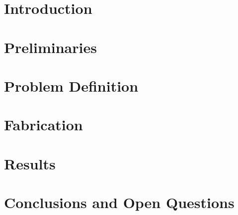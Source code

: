 \documentclass[a4paper]{article}
\begin{document}
\newpage
{}%
\section{Introduction}


\newpage
\section{Preliminaries}

\newpage
\section{Problem Definition}


\newpage
\section{Fabrication}
\label{sec:fab}


\newpage
\section{Results}


\newpage
\section{Conclusions and Open Questions}

\newpage
\end{document}
